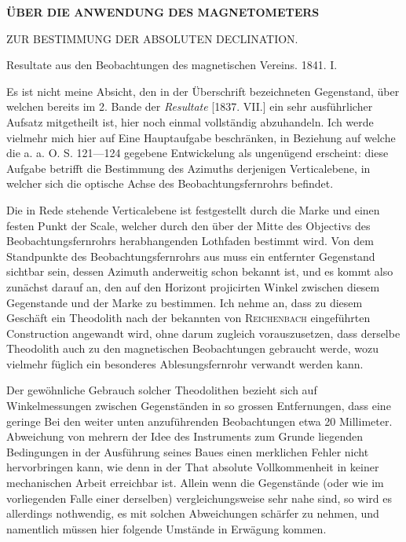 \clearpage
{}
\begin{center}
{\Large\bfseries ÜBER DIE ANWENDUNG DES MAGNETOMETERS\par\medskip ZUR BESTIMMUNG DER ABSOLUTEN DECLINATION.}
\par\bigskip
Resultate aus den Beobachtungen des magnetischen Vereins. 1841. I.
\end{center}
Es ist nicht meine Absicht, den in der Überschrift bezeichneten Gegenstand, über welchen bereits im 2. Bande der \textit{Resultate} [1837. VII.] ein sehr ausführlicher Aufsatz mitgetheilt ist, hier noch einmal vollständig abzuhandeln. Ich werde vielmehr mich hier auf Eine Hauptaufgabe beschränken, in Beziehung auf welche die a. a. O. S. 121—124 gegebene Entwickelung als ungenügend erscheint: diese Aufgabe betrifft die Bestimmung des Azimuths derjenigen Verticalebene, in welcher sich die optische Achse des Beobachtungsfernrohrs befindet.

Die in Rede stehende Verticalebene ist festgestellt durch die Marke und einen festen Punkt der Scale, welcher durch den über der Mitte des Objectivs des Beobachtungsfernrohrs herabhangenden Lothfaden bestimmt wird. Von dem Standpunkte des Beobachtungsfernrohrs aus muss ein entfernter Gegenstand sichtbar sein, dessen Azimuth anderweitig schon bekannt ist, und es kommt also zunächst darauf an, den auf den Horizont projicirten Winkel zwischen diesem Gegenstande und der Marke zu bestimmen. Ich nehme an, dass zu diesem Geschäft ein Theodolith nach der bekannten von \textsc{Reichenbach} eingeführten Construction angewandt wird, ohne darum zugleich vorauszusetzen, dass derselbe Theodolith auch zu den magnetischen Beobachtungen gebraucht werde, wozu vielmehr füglich ein besonderes Ablesungsfernrohr verwandt werden kann.

Der gewöhnliche Gebrauch solcher Theodolithen bezieht sich auf Winkel\-messungen zwischen Gegenständen in so grossen Entfernungen, dass eine geringe
\expandafter\def\csname HistoricalNoteText443\endcsname{Bei den weiter unten anzuführenden Beobachtungen etwa 20 Millimeter.}%
Abweichung von mehrern der Idee des Instruments zum Grunde liegenden Bedingungen in der Ausführung seines Baues einen merklichen Fehler nicht hervorbringen kann, wie denn in der That absolute Vollkommenheit in keiner mechanischen Arbeit erreichbar ist. Allein wenn die Gegenstände (oder wie im vorliegenden Falle einer derselben) vergleichungsweise sehr nahe sind, so wird es allerdings nothwendig, es mit solchen Abweichungen schärfer zu nehmen, und namentlich müssen hier folgende Umstände in Erwägung kommen.

